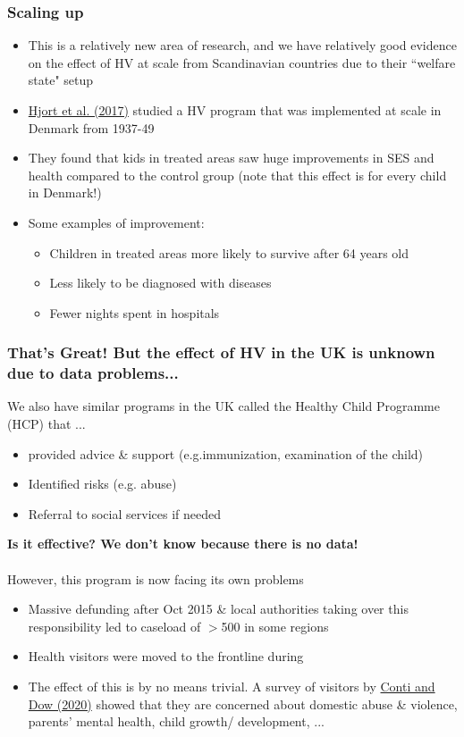 \subsubsection {Scaling up}
\begin{itemize}
    \item This is a relatively new area of research, and we have relatively good evidence on the effect of HV at scale from Scandinavian countries due to their ``welfare state" setup
    \item \href{https://www.aeaweb.org/articles?id=10.1257/app.20150087}{Hjort et al. (2017)} studied a HV program that was implemented at scale in Denmark from 1937-49
    \item They found that kids in treated areas saw huge improvements in SES and health compared to the control group (note that this effect is for every child in Denmark!)
    \item Some examples of improvement:
    \begin{itemize}
        \item Children in treated areas more likely to survive after 64 years old
        \item Less likely to be diagnosed with diseases
        \item Fewer nights spent in hospitals
    \end{itemize}
\end{itemize}
\subsubsection{That's Great! But the effect of HV in the UK is unknown due to data problems...}
We also have similar programs in the UK called the Healthy Child Programme (HCP) that ...
\begin{itemize}
    \item provided advice \& support (e.g.immunization, examination of the child)
    \item Identified risks (e.g. abuse)
    \item Referral to social services if needed
\end{itemize}
\textbf{Is it effective? We don't know because there is no data!}
\\ \\
However, this program is now facing its own problems
\begin{itemize}
    \item Massive defunding after Oct 2015 \& local authorities taking over this responsibility
    led to caseload of $>$500 in some regions
    \item Health visitors were moved to the frontline during 
    \item The effect of this is by no means trivial. A survey of visitors by \href{https://discovery.ucl.ac.uk/id/eprint/10106430/8/Conti_Dow_The%20impacts%20of%20COVID-19%20on%20Health%20Visiting%20in%20England%20250920.pdf}{Conti and Dow (2020)} showed that they are concerned about domestic abuse \& violence, parents' mental health, child growth/ development, ...
\end{itemize}
